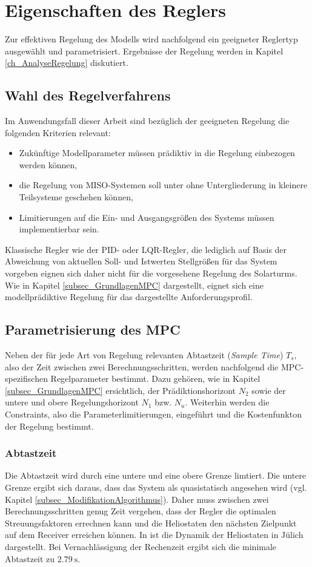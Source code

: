 \section{Eigenschaften des Reglers} \label{sec_Reglereigenschaften}
Zur effektiven Regelung des Modells wird nachfolgend ein geeigneter Reglertyp ausgewählt und parametrisiert.
Ergebnisse der Regelung werden in Kapitel \ref{ch_AnalyseRegelung} diskutiert.


\subsection{Wahl des Regelverfahrens} \label{subsec_ReglerverfahrenWahl}
Im Anwendungsfall dieser Arbeit sind bezüglich der geeigneten Regelung die folgenden Kriterien relevant:
\begin{itemize}
    \item Zukünftige Modellparameter müssen prädiktiv in die Regelung einbezogen werden können,
    \item die Regelung von MISO-Systemen soll unter ohne Untergliederung in kleinere Teilsysteme geschehen können,
    \item Limitierungen auf die Ein- und Ausgangsgrößen des Systems müssen implementierbar sein.
\end{itemize}
Klassische Regler wie der PID- oder LQR-Regler, die lediglich auf Basis der Abweichung von aktuellen Soll- und Istwerten Stellgrößen für das System vorgeben \cite[S.408]{Lunze} eignen sich daher nicht für die vorgesehene Regelung des Solarturms.
Wie in Kapitel \ref{subsec_GrundlagenMPC} dargestellt, eignet sich eine modellprädiktive Regelung für das dargestellte Anforderungsprofil.


\subsection{Parametrisierung des MPC} \label{subsec_ParameterMPC}
Neben der für jede Art von Regelung relevanten Abtastzeit (\textit{Sample Time}) $T_s$, also der Zeit zwischen zwei Berechnungsschritten, werden nachfolgend die MPC-spezifischen Regelparameter bestimmt.
Dazu gehören, wie in Kapitel \ref{subsec_GrundlagenMPC} ersichtlich, der Prädiktionshorizont $N_2$ sowie der untere und obere Regelungshorizont $N_1$ bzw. $N_u$.
Weiterhin werden die Constraints, also die Parameterlimitierungen, eingeführt und die Kostenfunkton der Regelung bestimmt.

\subsubsection*{Abtastzeit} \label{subsubsec_sampletime}
Die Abtastzeit wird durch eine untere und eine obere Grenze limtiert.
Die untere Grenze ergibt sich daraus, dass das System als quasistatisch angesehen wird (vgl. Kapitel \ref{subsec_ModifikationAlgorithmus}).
Daher muss zwischen zwei Berechnungsschritten genug Zeit vergehen, dass der Regler die optimalen Streuungsfaktoren errechnen kann und die Heliostaten den nächsten Zielpunkt auf dem Receiver erreichen können.
In \cite[S.25-26]{DissZanger} ist die Dynamik der Heliostaten in Jülich dargestellt.
Bei Vernachlässigung der Rechenzeit ergibt sich die minimale Abtastzeit zu $\SI{2.79}{\second}$.

